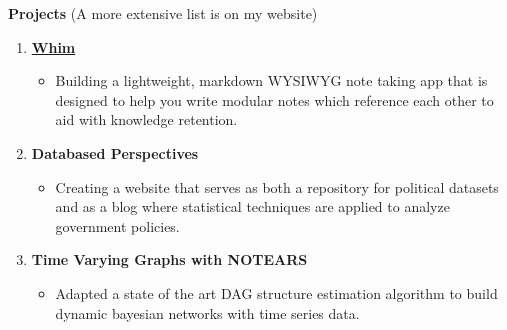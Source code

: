 \documentclass[letterpaper,11pt]{article}
\newlength{\outerbordwidth}
\newcommand{\resitem}[1]{\item #1 \vspace{-2pt}}
\newcommand{\resheading}[1]{\vspace{0pt} %
  \parbox{\textwidth}{\setlength{\FrameSep}{\outerbordwidth}
    \begin{shaded}
\setlength{\fboxsep}{0pt}\framebox[\textwidth][l]{\setlength{\fboxsep}{3.5pt}\fcolorbox{shadecolorB}{shadecolorB}{\textbf{\sffamily{\mbox{~}\makebox[7.262in][l]{\large #1} \vphantom{p\^{E}}}}}} %
    \end{shaded}
  }\vspace{-7pt} %
}
\begin{document}
\vspace{-10pt}

\begin{mybox}
	\hspace{-8pt} \textbf{Projects}  \fontsize{10.5}{15}\selectfont   (A more extensive list is on my website)
\end{mybox}


\vspace{-5pt}
\begin{enumerate}[leftmargin=10pt]
\setlength\itemsep{1em}

\item[] \href{https://whim.so/}{\textbf{Whim}}\\
\vspace{-4pt}
\begin{itemize}
	\resitem{Building a lightweight, markdown WYSIWYG note taking app that is designed to help you write modular notes which reference each other to aid with knowledge retention.}
\end{itemize}

\vspace{-12pt}

\item[] \textbf{Databased Perspectives}\\
\vspace{-4pt}
\begin{itemize}
	\resitem{Creating a website that serves as both a repository for political datasets and as a blog where statistical techniques are applied to analyze government policies.}
\end{itemize}

\vspace{-12pt}

\item[] \textbf{Time Varying Graphs with NOTEARS}\\
\vspace{-4pt}
\begin{itemize}
	\resitem{Adapted a state of the art DAG structure estimation algorithm to build dynamic bayesian networks with time series data.}
\end{itemize}

\end{enumerate}
\end{document}
